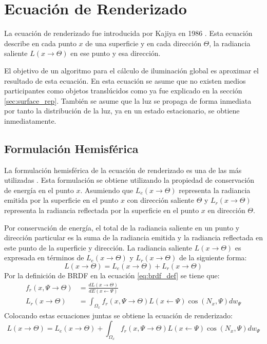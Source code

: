 \section{Ecuación de Renderizado}
La ecuación de renderizado fue introducida por Kajiya  en 1986 \cite{kajiya86}. Esta ecuación describe en cada punto $x$ de una superficie y en cada dirección $\Theta$, la radiancia saliente $L(x\to\Theta)$ en ese punto y esa dirección.

El objetivo de un algoritmo para el cálculo de iluminación global es aproximar el resultado de esta ecuación. En esta ecuación se asume que no existen medios participantes como objetos translúcidos como ya fue explicado en la sección \ref{sec:surface_rep}. También se asume que la luz se propaga de forma inmediata por tanto la distribución de la luz, ya en un estado estacionario, se obtiene inmediatamente. 

\subsection{Formulación Hemisférica}
La formulación hemisférica de la ecuación de renderizado es una de las más utilizadas \cite{advanced_gi2006}. Esta formulación se obtiene utilizando la propiedad de conservación de energía en el punto $x$. Asumiendo que $L_{e}(x\to\Theta)$ representa la radiancia emitida por la superficie en el punto $x$ con dirección saliente $\Theta$ y $L_{r}(x\to\Theta)$ representa la radiancia reflectada por la superficie en el punto $x$ en dirección $\Theta$.

Por conservación de energía, el total de la radiancia saliente en un punto y dirección particular es la suma de la radiancia emitida y la radiancia reflectada en este punto de la superficie y dirección. La radiancia saliente $L(x\to\Theta)$ es expresada en términos de $L_{e}(x\to\Theta)$ y $L_{r}(x\to\Theta)$ de la siguiente forma:
\begin{equation}
    L(x\to\Theta) = L_{e}(x\to\Theta) + L_{r}(x\to\Theta)
    \label{eq:reflectance}
\end{equation}
Por la definición de \ac{BRDF} en la ecuación \ref{eq:brdf_def} se tiene que:
\begin{equation}
	\begin{split}
        f_{r}(x, \Psi\to\Theta) &= \frac{dL(x\to\Theta)}{dE(x\gets\Psi)}\\
        L_{r}(x\to\Theta) &= \int_{\Omega_{x}}{f_{r}(x, \Psi\to\Theta)L(x\gets\Psi)\cos(N_{x}, \Psi)dw_{\Psi}}
	\end{split}
	\label{eq:rendering_eq_LR}
\end{equation}
Colocando estas ecuaciones juntas se obtiene la ecuación de renderizado:
\begin{equation}
    L(x\to\Theta) = L_{e}(x\to\Theta) + \int_{\Omega_{x}}{f_{r}(x, \Psi\to\Theta)L(x\gets\Psi)\cos(N_{x}, \Psi)dw_{\Psi}}
    \label{eq:rendering_eq}
\end{equation}

